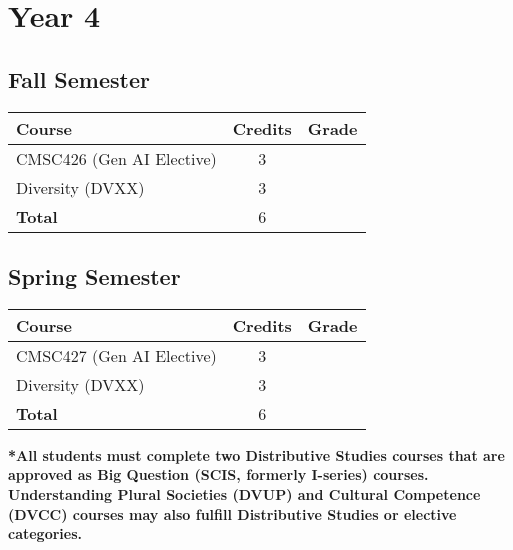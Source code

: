 \section*{Year 4}
\subsection*{Fall Semester}
\begin{tabular}{|l|c|c|}
    \hline
    Course & Credits & Grade \\
    \hline
    CMSC426 (Gen AI Elective) & 3 & \\
    Diversity (DVXX) & 3 & \\
    \hline
    \textbf{Total} & 6 & \\
    \hline
\end{tabular}

\subsection*{Spring Semester}
\begin{tabular}{|l|c|c|}
    \hline
    Course & Credits & Grade \\
    \hline
    CMSC427 (Gen AI Elective) & 3 & \\
    Diversity (DVXX) & 3 & \\
    \hline
    \textbf{Total} & 6 & \\
    \hline
\end{tabular}

\vspace{1cm}
\textbf{*All students must complete two Distributive Studies courses that are approved as Big Question (SCIS, formerly I-series) courses. Understanding Plural Societies (DVUP) and Cultural Competence (DVCC) courses may also fulfill Distributive Studies or elective categories.}
